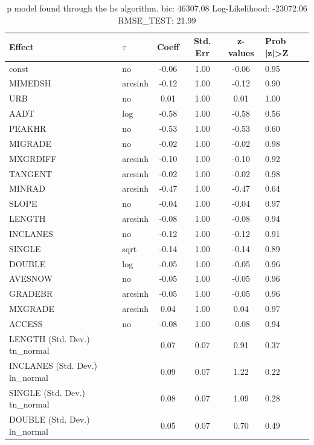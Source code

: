 \begin{table}
	\caption{p model found through the hs algorithm. bic: 46307.08 Log-Likelihood: -23072.06 RMSE_TEST: 21.99}
	\begin{center}
		\begin{tabular}{|l|l|c|c|c|l|}
			\hline
			Effect & $\tau$ & Coeff & Std. Err & z-values & Prob |z|>Z \\
			\hline
			const & no & -0.06 & 1.00 & -0.06 & 0.95 \\
			\hline
			MIMEDSH & arcsinh & -0.12 & 1.00 & -0.12 & 0.90 \\
			\hline
			URB & no & 0.01 & 1.00 & 0.01 & 1.00 \\
			\hline
			AADT & log & -0.58 & 1.00 & -0.58 & 0.56 \\
			\hline
			PEAKHR & no & -0.53 & 1.00 & -0.53 & 0.60 \\
			\hline
			MIGRADE & no & -0.02 & 1.00 & -0.02 & 0.98 \\
			\hline
			MXGRDIFF & arcsinh & -0.10 & 1.00 & -0.10 & 0.92 \\
			\hline
			TANGENT & arcsinh & -0.02 & 1.00 & -0.02 & 0.98 \\
			\hline
			MINRAD & arcsinh & -0.47 & 1.00 & -0.47 & 0.64 \\
			\hline
			SLOPE & no & -0.04 & 1.00 & -0.04 & 0.97 \\
			\hline
			LENGTH & arcsinh & -0.08 & 1.00 & -0.08 & 0.94 \\
			\hline
			INCLANES & no & -0.12 & 1.00 & -0.12 & 0.91 \\
			\hline
			SINGLE & sqrt & -0.14 & 1.00 & -0.14 & 0.89 \\
			\hline
			DOUBLE & log & -0.05 & 1.00 & -0.05 & 0.96 \\
			\hline
			AVESNOW & no & -0.05 & 1.00 & -0.05 & 0.96 \\
			\hline
			GRADEBR & arcsinh & -0.05 & 1.00 & -0.05 & 0.96 \\
			\hline
			MXGRADE & arcsinh & 0.04 & 1.00 & 0.04 & 0.97 \\
			\hline
			ACCESS & no & -0.08 & 1.00 & -0.08 & 0.94 \\
			\hline
			LENGTH (Std. Dev.) tn_normal &  & 0.07 & 0.07 & 0.91 & 0.37 \\
			\hline
			INCLANES (Std. Dev.) ln_normal &  & 0.09 & 0.07 & 1.22 & 0.22 \\
			\hline
			SINGLE (Std. Dev.) tn_normal &  & 0.08 & 0.07 & 1.09 & 0.28 \\
			\hline
			DOUBLE (Std. Dev.) ln_normal &  & 0.05 & 0.07 & 0.70 & 0.49 \\

\end{tabular}
\end{center}
\end{table}
